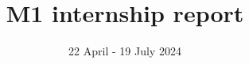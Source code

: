 \title{M1 internship report}
\subject{Investigating Graph Parameters for Bounds Under SETH in \NP-hard Problems}
\date{22 April - 19 July 2024}

\maketitle